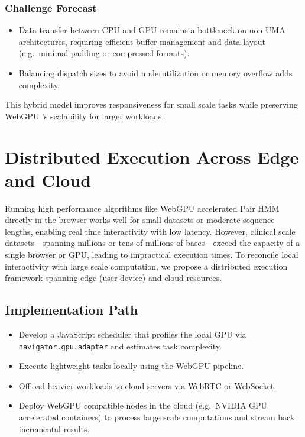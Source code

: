 \documentclass[PhD]{PHlab-thesis}
\begin{document}
\subsubsection*{Challenge Forecast}
\begin{itemize}
  \item Data transfer between CPU and GPU remains a bottleneck on non UMA architectures, requiring efficient buffer management and data layout (e.g.\ minimal padding or compressed formats).
  \item Balancing dispatch sizes to avoid underutilization or memory overflow adds complexity.
\end{itemize}

This hybrid model improves responsiveness for small scale tasks while preserving WebGPU 's scalability for larger workloads.

\section{Distributed Execution Across Edge and Cloud}

Running high performance algorithms like WebGPU accelerated Pair HMM directly in the browser works well for small datasets or moderate sequence lengths, enabling real time interactivity with low latency. However, clinical scale datasets—spanning millions or tens of millions of bases—exceed the capacity of a single browser or GPU, leading to impractical execution times. To reconcile local interactivity with large scale computation, we propose a distributed execution framework spanning edge (user device) and cloud resources.

\subsection*{Implementation Path}
\begin{itemize}
  \item Develop a JavaScript scheduler that profiles the local GPU via \texttt{navigator.gpu.adapter} and estimates task complexity.
  \item Execute lightweight tasks locally using the WebGPU pipeline.
  \item Offload heavier workloads to cloud servers via WebRTC or WebSocket.
  \item Deploy WebGPU compatible nodes in the cloud (e.g.\ NVIDIA GPU accelerated containers) to process large scale computations and stream back incremental results.
\end{itemize}
\end{document}
